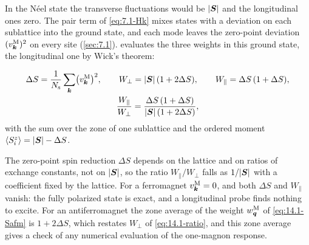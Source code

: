 In the Néel state the transverse fluctuations would be $|\bm{S}|$ and the longitudinal ones zero. The pair term of \cref{eq:7.1-Hk} mixes states with a deviation on each sublattice into the ground state, and each mode leaves the zero-point deviation $(v^{\mathrm{M}}_{\bm{k}})^2$ on every site (\cref{sec:7.1}).  evaluates the three weights in this ground state, the longitudinal one by Wick's theorem:
\begin{keyresult}
\begin{equation}
  \begin{gathered}
  \Delta S = \frac{1}{N_{\mathrm{s}}}\sum_{\bm{k}}\bigl(v^{\mathrm{M}}_{\bm{k}}\bigr)^2, \qquad
  W_\perp = |\bm{S}|\,(1 + 2\Delta S), \qquad
  W_\parallel = \Delta S\,(1 + \Delta S), \\
  \frac{W_\parallel}{W_\perp} = \frac{\Delta S\,(1 + \Delta S)}{|\bm{S}|\,(1 + 2\Delta S)} ,
  \end{gathered}
  \label{eq:14.1-ratio}
\end{equation}
with the sum over the zone of one sublattice and the ordered moment $\langle S^z_i\rangle = |\bm{S}| - \Delta S$.
\end{keyresult}
\noindent The zero-point spin reduction $\Delta S$ depends on the lattice and on ratios of exchange constants, not on $|\bm{S}|$, so the ratio $W_\parallel/W_\perp$ falls as $1/|\bm{S}|$ with a coefficient fixed by the lattice. For a ferromagnet $v^{\mathrm{M}}_{\bm{k}} = 0$, and both $\Delta S$ and $W_\parallel$ vanish: the fully polarized state is exact, and a longitudinal probe finds nothing to excite. For an antiferromagnet the zone average of the weight $w^{\mathrm{M}}_{\bm{q}}$ of \cref{eq:14.1-Safm} is $1 + 2\Delta S$, which restates $W_\perp$ of \cref{eq:14.1-ratio}, and this zone average gives a check of any numerical evaluation of the one-magnon response.

